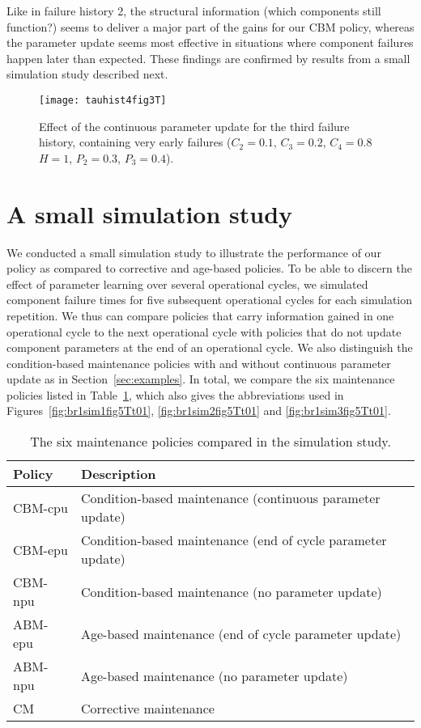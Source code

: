 \documentclass[authoryear]{elsarticle}
\begin{document}
Like in failure history 2, the structural information (which components still function?)
seems to deliver a major part of the gains for our CBM policy,
whereas the parameter update seems most effective in situations where
component failures happen later than expected.
These findings are confirmed by results from a small simulation study described next.

\begin{figure}
\texttt{[image: tauhist4fig3T]}
\caption{Effect of the continuous parameter update for the third failure history,
containing very early failures ($C_2 = 0.1$, $C_3 = 0.2$, $C_4 = 0.8$ $H = 1$, $P_2 = 0.3$, $P_3 = 0.4$).}
\label{fig:tauhist4fig3T}
\end{figure}


\section{A small simulation study}
\label{sec:sim}

We conducted a small simulation study to illustrate the performance of our policy
as compared to corrective and age-based policies.
To be able to discern the effect of parameter learning over several operational cycles,
we simulated component failure times for five subsequent operational cycles for each simulation repetition.
We thus can compare policies that carry information gained in one operational cycle to the next operational cycle
with policies that do not update component parameters at the end of an operational cycle.
We also distinguish the condition-based maintenance policies with and without continuous parameter update
as in Section~\ref{sec:examples}.
In total, we compare the six maintenance policies listed in Table~\ref{tab:sim-abbrev},
which also gives the abbreviations used in Figures~\ref{fig:br1sim1fig5Tt01}, \ref{fig:br1sim2fig5Tt01} and \ref{fig:br1sim3fig5Tt01}.

\begin{table}
\centering
\begin{tabular}{ll}
  \toprule
Policy & Description \\
  \midrule
CBM-cpu & Condition-based maintenance (continuous parameter update)\\
CBM-epu & Condition-based maintenance (end of cycle parameter update)\\
CBM-npu & Condition-based maintenance (no parameter update)\\
ABM-epu & Age-based maintenance (end of cycle parameter update)\\
ABM-npu & Age-based maintenance (no parameter update)\\
CM      & Corrective maintenance\\
  \bottomrule
\end{tabular}
\caption{The six maintenance policies compared in the simulation study.}
\label{tab:sim-abbrev}
\end{table}
\end{document}
